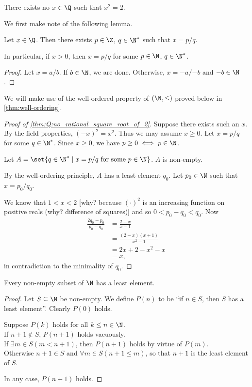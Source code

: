 \begin{theorem} \label{thm:Q:no_rational_square_root_of_2}
    There exists no $x \in \Q$ such that $x^2 = 2$.
\end{theorem}
We first make note of the following lemma.
\begin{lemma} \label{thm:positive_denominator}
    Let $x \in \Q$.
    Then there exists $p \in \Z$, $q \in \N^*$ such that $x = p/q$.

    In particular, if $x > 0$, then $x = p/q$ for some $p \in \N$, $q \in \N^*$.
\end{lemma}
\begin{proof}
    Let $x = a/b$.
    If $b \in \N$, we are done.
    Otherwise, $x = -a/{-b}$ and $-b \in \N$. %
\end{proof}
We will make use of the well-ordered property of $(\N, \le)$ proved below in
\cref{thm:well-ordering}.
\begin{proof}[Proof of \cref{thm:Q:no_rational_square_root_of_2}]
    Suppose there exists such an $x$.
    By the field properties, $(-x)^2 = x^2$.
    Thus we may assume $x \ge 0$.
    Let $x = p/q$ for some $q \in \N^*$.
    Since $x \ge 0$, we have $p \ge 0 \iff p \in \N$.

    Let $A = \set{q \in \N^* \mid x = p/q \text{ for some } p \in \N}$.
    $A$ is non-empty.

    By the well-ordering principle, $A$ has a least element $q_0$.
    Let $p_0 \in \N$ such that $x = p_0/q_0$.

    We know that $1 < x < 2$ [why? because $(\cdot)^2$ is an increasing function
    on positive reals (why? difference of squares)] and so $0 < p_0-q_0 < q_0$.
    Now \begin{align*}
        \frac{2q_0 - p_0}{p_0 - q_0}
            &= \frac{2 - x}{x - 1} \\
            &= \frac{(2 - x)(x + 1)}{x^2 - 1} \\
            &= 2x + 2 - x^2 - x \\
            &= x,
    \end{align*}
    in contradiction to the minimality of $q_0$.
\end{proof}

\begin{theorem} \label{thm:well-ordering}
    Every non-empty subset of $\N$ has a least element.
\end{theorem}
\begin{proof}
    Let $S \subseteq \N$ be non-empty.
    We define $P(n)$ to be ``if $n \in S$, then $S$ has a least element''.
    Clearly $P(0)$ holds.

    Suppose $P(k)$ holds for all $k \le n \in \N$. \\
    If $n+1 \notin S$, $P(n+1)$ holds vacuously. \\
    If $\exists m \in S (m < n+1)$, then $P(n+1)$ holds by virtue of $P(m)$. \\
    Otherwise $n+1 \in S$ and $\forall m \in S (n+1 \le m)$, so that $n+1$ is
    the least element of $S$.

    In any case, $P(n+1)$ holds.
\end{proof}

